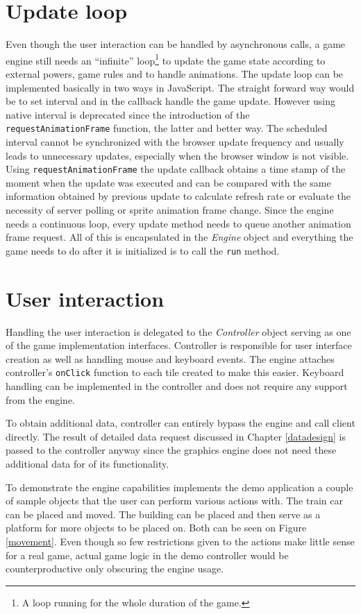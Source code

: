 \documentclass[11pt,oneside, final]{fithesis2}
\begin{document}
\section{Update loop}
Even though the user interaction can be handled by asynchronous calls, a game engine still needs an ``infinite'' loop\footnote{A loop running for the whole duration of the game.} to update the game state according to external powers, game rules and to handle animations. The update loop can be implemented basically in two ways in JavaScript. The straight forward way would be to set interval and in the callback handle the game update. However using native interval is deprecated since the introduction of the \texttt{requestAnimationFrame} function\cite{raf}, the latter and better way. The scheduled interval cannot be synchronized with the browser update frequency and usually leads to unnecessary updates, especially when the browser window is not visible\cite{animationtiming}. Using \texttt{requestAnimationFrame} the update callback obtains a time stamp of the moment when the update was executed and can be compared with the same information obtained by previous update to calculate refresh rate or evaluate the necessity of server polling or sprite animation frame change. Since the engine needs a continuous loop, every update method needs to queue another animation frame request\cite{raf}. All of this is encapsulated in the \emph{Engine} object and everything the game needs to do after it is initialized is to call the \texttt{run} method.

\section{User interaction}
Handling the user interaction is delegated to the \emph{Controller} object serving as one of the game implementation interfaces. Controller is responsible for user interface creation as well as handling mouse and keyboard events. The engine attaches controller's \texttt{onClick} function to each tile created to make this easier. Keyboard handling can be implemented in the controller and does not require any support from the engine.

To obtain additional data, controller can entirely bypass the engine and call client directly. The result of detailed data request discussed in Chapter \ref{datadesign} is passed to the controller anyway since the graphics engine does not need these additional data for of its functionality.

To demonstrate the engine capabilities implements the demo application a couple of sample objects that the user can perform various actions with. The train car can be placed and moved. The building can be placed and then serve as a platform for more objects to be placed on. Both can be seen on Figure \ref{movement}. Even though so few restrictions given to the actions make little sense for a real game, actual game logic in the demo controller would be counterproductive only obscuring the engine usage.
\end{document}
